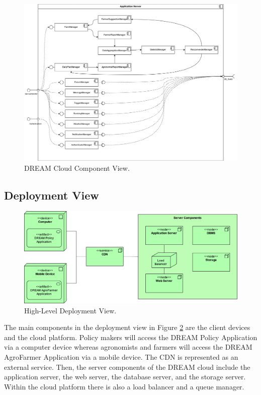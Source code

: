 \clearpage
\begin{figure}[hbt!]
\centering
\includegraphics[width=\textwidth]{../images_diagrams/dd/component_only_application.png}
\caption{DREAM Cloud Component View.}
\label{fig:ApplicationServerOnlyComp}
\end{figure}

\subsection{Deployment View}
\begin{figure}[hbt!]
\centering
\includegraphics[width=\textwidth]{../images_diagrams/dd/highlevel_deployment.png}
\caption{High-Level Deployment View.}
\label{fig:highLevelDeploy}
\end{figure}

\begin{flushleft}
The main components in the deployment view in Figure \ref{fig:highLevelDeploy} are the client devices and the cloud platform. Policy makers will access the DREAM Policy Application via a computer device whereas agronomists and farmers will access the DREAM AgroFarmer Application via a mobile device. The CDN is represented as an external service. Then, the server components of the DREAM cloud include the application server, the web server, the database server, and the storage server. Within the cloud platform there is also a load balancer and a queue manager.
\end{flushleft}




